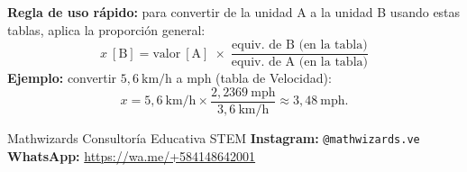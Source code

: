 \documentclass[12pt, letterpaper]{article}
\begin{document}
\begin{cuadropasos}
    \textbf{Regla de uso rápido:} para convertir de la unidad A a la unidad B usando
    estas tablas, aplica la proporción general:
    \[
        x\ [\text{B}] = \text{valor}\ [\text{A}]
        \;\times\; \frac{\text{equiv. de B (en la tabla)}}{\text{equiv. de A (en la tabla)}}
    \]
    \textbf{Ejemplo:} convertir $5{,}6\ \text{km/h}$ a mph (tabla de Velocidad):
    \[
        x = 5{,}6\ \text{km/h} \times \frac{2{,}2369\ \text{mph}}{3{,}6\ \text{km/h}}
        \approx 3{,}48\ \text{mph}.
    \]
\end{cuadropasos}

\vspace*{\fill}
\begin{center}
    \footnotesize\color{mwgris}
    Mathwizards Consultoría Educativa STEM
    \quad\textbullet\quad
    \textbf{Instagram:} \texttt{@mathwizards.ve}
    \quad\textbullet\quad
    \textbf{WhatsApp:} \url{https://wa.me/+584148642001}
\end{center}
\end{document}
